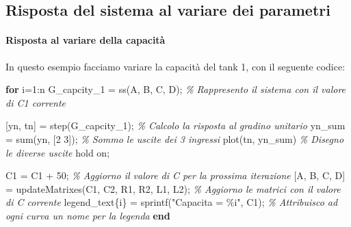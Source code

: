 \documentclass[
]{article}
\newenvironment{Shaded}{}{}
\newcommand{\CommentTok}[1]{\textcolor[rgb]{0.38,0.63,0.69}{\textit{#1}}}
\newcommand{\FloatTok}[1]{\textcolor[rgb]{0.25,0.63,0.44}{#1}}
\newcommand{\KeywordTok}[1]{\textcolor[rgb]{0.00,0.44,0.13}{\textbf{#1}}}
\newcommand{\NormalTok}[1]{#1}
\newcommand{\OperatorTok}[1]{\textcolor[rgb]{0.40,0.40,0.40}{#1}}
\newcommand{\StringTok}[1]{\textcolor[rgb]{0.25,0.44,0.63}{#1}}
\newcommand{\VariableTok}[1]{\textcolor[rgb]{0.10,0.09,0.49}{#1}}
\begin{document}
\hypertarget{risposta-del-sistema-al-variare-dei-parametri}{%
\subsection{Risposta del sistema al variare dei
parametri}\label{risposta-del-sistema-al-variare-dei-parametri}}

\hypertarget{risposta-al-variare-della-capacituxe0}{%
\paragraph{Risposta al variare della
capacità}\label{risposta-al-variare-della-capacituxe0}}

In questo esempio facciamo variare la capacità del tank 1, con il
seguente codice:

\begin{Shaded}
\begin{Highlighting}[]
\KeywordTok{for} \VariableTok{i}\OperatorTok{=}\FloatTok{1}\OperatorTok{:}\VariableTok{n}
    \VariableTok{G\_capcity\_1} \OperatorTok{=} \VariableTok{ss}\NormalTok{(}\VariableTok{A}\OperatorTok{,} \VariableTok{B}\OperatorTok{,} \VariableTok{C}\OperatorTok{,} \VariableTok{D}\NormalTok{)}\OperatorTok{;}       \CommentTok{\% Rappresento il sistema con il valore di C1 corrente}

\NormalTok{    [}\VariableTok{yn}\OperatorTok{,} \VariableTok{tn}\NormalTok{] }\OperatorTok{=} \VariableTok{step}\NormalTok{(}\VariableTok{G\_capcity\_1}\NormalTok{)}\OperatorTok{;}       \CommentTok{\% Calcolo la risposta al gradino unitario}
    \VariableTok{yn\_sum} \OperatorTok{=} \VariableTok{sum}\NormalTok{(}\VariableTok{yn}\OperatorTok{,}\NormalTok{ [}\FloatTok{2} \FloatTok{3}\NormalTok{])}\OperatorTok{;}            \CommentTok{\% Sommo le uscite dei 3 ingressi}
    \VariableTok{plot}\NormalTok{(}\VariableTok{tn}\OperatorTok{,} \VariableTok{yn\_sum}\NormalTok{)                    }\CommentTok{\% Disegno le diverse uscite}
    \VariableTok{hold} \VariableTok{on}\OperatorTok{;}

    \VariableTok{C1} \OperatorTok{=} \VariableTok{C1} \OperatorTok{+} \FloatTok{50}\OperatorTok{;}                       \CommentTok{\% Aggiorno il valore di C per la prossima iterazione}
\NormalTok{    [}\VariableTok{A}\OperatorTok{,} \VariableTok{B}\OperatorTok{,} \VariableTok{C}\OperatorTok{,} \VariableTok{D}\NormalTok{] }\OperatorTok{=} \VariableTok{updateMatrixes}\NormalTok{(}\VariableTok{C1}\OperatorTok{,} \VariableTok{C2}\OperatorTok{,} \VariableTok{R1}\OperatorTok{,} \VariableTok{R2}\OperatorTok{,} \VariableTok{L1}\OperatorTok{,} \VariableTok{L2}\NormalTok{)}\OperatorTok{;}  \CommentTok{\% Aggiorno le matrici con il valore di C corrente}
    \VariableTok{legend\_text}\NormalTok{\{}\VariableTok{i}\NormalTok{\} }\OperatorTok{=} \VariableTok{sprintf}\NormalTok{(}\StringTok{"Capacita\textquotesingle{} = \%i"}\OperatorTok{,} \VariableTok{C1}\NormalTok{)}\OperatorTok{;}         \CommentTok{\% Attribuisco ad ogni curva un nome per la legenda}
\KeywordTok{end}
\end{Highlighting}
\end{Shaded}
\end{document}
